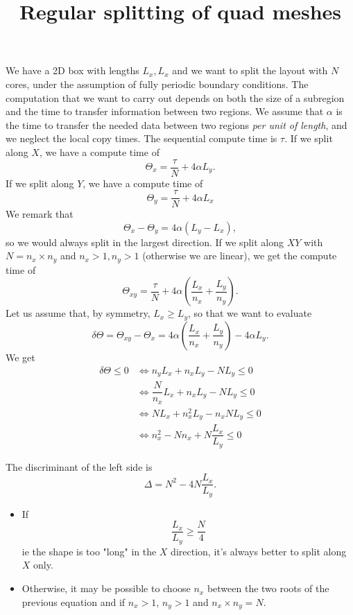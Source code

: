 \documentclass[aps]{revtex4}
\begin{document}
\title{Regular splitting of quad meshes}
\maketitle
We have a 2D box with lengths $L_x,L_x$ and
we want to split the layout with $N$ cores, under the assumption
of fully periodic boundary conditions. The computation
that we want to carry out depends on both the size of
a subregion and the time to transfer information between two
regions.
We assume that $\alpha$ is the time to transfer the needed data 
between two regions \emph{per unit of length}, and
we neglect the local copy times.
The sequential compute time is $\tau$.
If we split along $X$, we have a compute time of
\begin{equation}
	\Theta_x = \dfrac{\tau}{N} + 4\alpha L_y.
\end{equation}
If we split along $Y$, we have a compute time of
\begin{equation}
	\Theta_y = \dfrac{\tau}{N} + 4\alpha L_x
\end{equation}
We remark that
\begin{equation}
	\Theta_x - \Theta_y = 4\alpha\left(L_y-L_x\right),
\end{equation}
so we would always split in the largest direction.
If we split along $XY$ with $N=n_x \times n_y$ and $n_x>1,n_y>1$ (otherwise we are linear),
we get the compute time of
\begin{equation}
	\Theta_{xy} = \dfrac{\tau}{N} + 4\alpha\left(\dfrac{L_x}{n_x}+\dfrac{L_y}{n_y}\right).
\end{equation}
Let us assume that, by symmetry, $L_x\geq L_y$, so that we want to evaluate
\begin{equation}
	\delta \Theta = \Theta_{xy}-\Theta_x = 4\alpha\left(\dfrac{L_x}{n_x}+\dfrac{L_y}{n_y}\right) -
	4\alpha L_y.
\end{equation}	
We get
\begin{align}
	\delta \Theta \leq 0 & \Leftrightarrow n_yL_x + n_xL_y - N L_y \leq 0 \\
	& \Leftrightarrow \dfrac{N}{n_x} L_x + n_x L_y - N L_y \leq 0\\
	& \Leftrightarrow N L_x + n_x^2 L_y - n_x N L_y \leq 0\\
	& \Leftrightarrow n_x^2 - N n_x + N \dfrac{L_x}{L_y} \leq 0
\end{align}

The discriminant of the left side is 
\begin{equation}
	\Delta = N^2 - 4 N \dfrac{L_x}{L_y}.
\end{equation}
\begin{itemize}
	\item If 
		\begin{equation}
		\dfrac{L_x}{L_y}\geq \dfrac{N}{4}
		\end{equation}
		ie the shape is too "long" in the $X$ direction, it's always better to split along $X$ only.
	\item Otherwise, it may be possible to choose $n_x$ between the two roots of the previous equation
	and if $n_x>1$, $n_y>1$ and $n_x \times n_y = N$.
\end{itemize}
\end{document}
